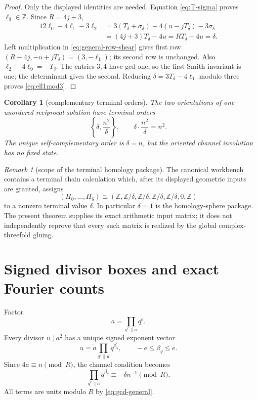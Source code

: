 \documentclass[11pt]{article}
\newtheorem{corollary}[theorem]{Corollary}
\theoremstyle{definition}
\theoremstyle{remark}
\newtheorem{remark}[theorem]{Remark}
\newcommand{\Z}{\mathbb Z}
\newcommand{\1}{\mathbf 1}
\begin{document}
\begin{proof}
Only the displayed identities are needed.  Equation \eqref{eq:T-sigma}
proves $\ell_0\in\Z$.  Since $R=4j+3$,
\begin{align*}
 12\ell_0-4\ell_1-3\ell_2
 &=3(T_\delta+\sigma_\delta)-4(u-jT_\delta)
   -3\sigma_\delta\\
 &=(4j+3)T_\delta-4u=RT_\delta-4u=\delta.
\end{align*}
Left multiplication in \eqref{eq:general-row-shear} gives first row
$(R-4j,-u+jT_\delta)=(3,-\ell_1)$; its second row is unchanged.  Also
$\ell_2-4\ell_0=-T_\delta$.  The entries $3,4$ have gcd one, so the first
Smith invariant is one; the determinant gives the second.  Reducing
$\delta=3T_\delta-4\ell_1$ modulo three proves \eqref{eq:ell1mod3}.
\end{proof}

\begin{corollary}[complementary terminal orders]\label{cor:terminal-complement}
The two orientations of one unordered reciprocal solution have terminal
orders
\begin{equation}\label{eq:paired-orders}
 \left\{\delta,\frac{n^2}{\delta}\right\},
 \qquad
 \delta\cdot\frac{n^2}{\delta}=n^2.
\end{equation}
The unique self-complementary order is $\delta=n$, but the oriented channel
involution has no fixed state.
\end{corollary}

\begin{remark}[scope of the terminal homology package]
The canonical workbench contains a terminal chain calculation which, after
its displayed geometric inputs are granted, assigns
\[
 (H_0,\ldots,H_6)
 \cong
 (\Z,\Z/\delta,\Z/\delta,\Z/\delta,\Z/\delta,0,\Z)
\]
to a nonzero terminal value $\delta$.  In particular $\delta=1$ is the
homology-sphere package.  The present theorem supplies its exact arithmetic
input matrix; it does not independently reprove that every such matrix is
realized by the global complex-threefold gluing.
\end{remark}

\section{Signed divisor boxes and exact Fourier counts}

Factor
\begin{equation}\label{eq:a-factor}
 a=\prod_{q^e\parallel a}q^e.
\end{equation}
Every divisor $u\mid a^2$ has a unique signed exponent vector
\begin{equation}\label{eq:signed-exponents}
 u=a\prod_{q^e\parallel a}q^{\beta_q},
 \qquad -e\le\beta_q\le e.
\end{equation}
Since $4a\equiv n\pmod R$, the channel condition becomes
\begin{equation}\label{eq:signed-channel}
 \prod_{q^e\parallel a}q^{\beta_q}
 \equiv-\delta n^{-1}\pmod R.
\end{equation}
All terms are units modulo $R$ by \eqref{eq:gcd-general}.
\end{document}
